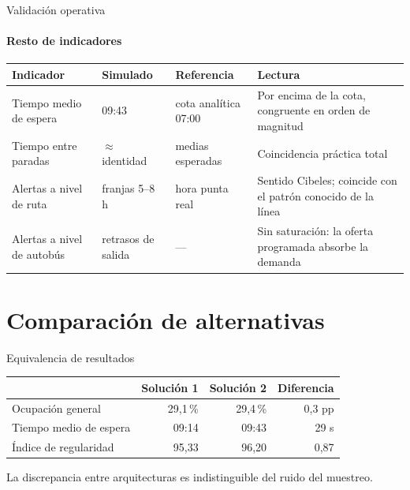 \documentclass[aspectratio=169]{beamer}
\begin{document}
\begin{frame}[t]{Validación operativa}
\framesubtitle{Resto de indicadores}
\vspace{0.8em}
\centering
{\scriptsize
\renewcommand{\arraystretch}{2}
\begin{tabular}{@{}l l l >{\raggedright\arraybackslash}p{5.0cm}@{}}
\toprule
\textbf{Indicador} & \textbf{Simulado} & \textbf{Referencia} & \textbf{Lectura} \\
\midrule
Tiempo medio de espera & 09:43 & cota analítica 07:00 &
  Por encima de la cota, congruente en orden de magnitud \\
Tiempo entre paradas & $\approx$ identidad & medias esperadas &
  Coincidencia práctica total\\
Alertas a nivel de ruta & franjas 5--8 h & hora punta real &
  Sentido Cibeles; coincide con el patrón conocido de la línea \\
Alertas a nivel de autobús & retrasos de salida & --- &
  Sin saturación: la oferta programada absorbe la demanda \\
\bottomrule
\end{tabular}}

\end{frame}

\section{Comparación de alternativas}
\begin{frame}\sectionpage\end{frame}

\begin{frame}[t]{Equivalencia de resultados}
\vfill
\centering
{\footnotesize
\begin{tabular}{@{}lrrr@{}}
\toprule
 & \textbf{Solución 1} & \textbf{Solución 2} & \textbf{Diferencia} \\
\midrule
Ocupación general      & 29,1\,\% & 29,4\,\% & 0,3 pp \\
Tiempo medio de espera & 09:14 & 09:43 & 29 s \\
Índice de regularidad  & 95,33 & 96,20 & 0,87 \\
\bottomrule
\end{tabular}}

\vspace{1.6em}

\vspace{1em}
{\footnotesize\color{black!65}La discrepancia entre arquitecturas es
indistinguible del ruido del muestreo.}
\vfill
\end{frame}
\end{document}
